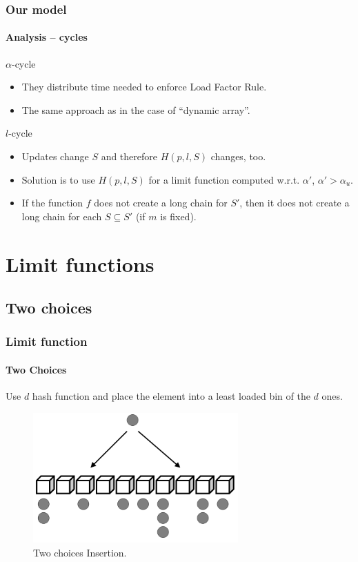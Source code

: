 \begin{frame}
	\frametitle{Our model}
	\framesubtitle{Analysis -- cycles}
	
	\begin{block}{$\alpha$-cycle}
		\begin{itemize}
			\item They distribute time needed to enforce Load Factor Rule.
			\item The same approach as in the case of ``dynamic array''.
		\end{itemize}
	\end{block}
	
	\begin{block}{$l$-cycle}
		\begin{itemize}
			\item Updates change $S$ and therefore $H(p, l, S)$ changes, too.
			\item Solution is to use $H(p, l, S)$ for a limit function computed w.r.t. $\alpha'$, $\alpha' > \alpha_u$.
			\item If the function $f$ does not create a long chain for $S'$, then it does not create a long chain for each $S \subseteq S'$ (if $m$ is fixed).
		\end{itemize}
	\end{block}
\end{frame}

\section{Limit functions}

\subsection{Two choices}
\begin{frame}
	\frametitle{Limit function}
	\framesubtitle{Two Choices}
	
	Use $d$ hash function and place the element into a least loaded bin of the $d$ ones.
	
	\begin{figure}
		\includegraphics[width=0.7\textwidth]{two-choices.png}
		
		\caption{Two choices Insertion.}
	\end{figure}
\end{frame}

